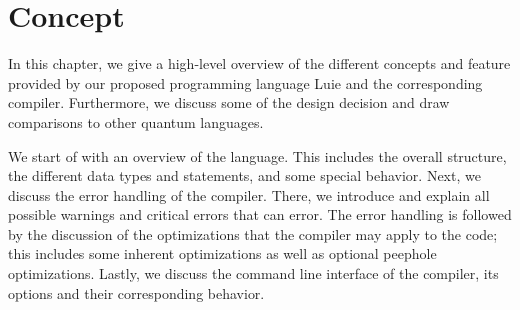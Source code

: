 \chapter{Concept}
In this chapter, we give a high-level overview of the different concepts and feature provided by our proposed programming language Luie and the corresponding compiler. Furthermore, we discuss some of the design decision and draw comparisons to other quantum languages. 

We start of with an overview of the language. This includes the overall structure, the different data types and statements, and some special behavior. Next, we discuss the error handling of the compiler. There, we introduce and explain all possible warnings and critical errors that can error. The error handling is followed by the discussion of the optimizations that the compiler may apply to the code; this includes some inherent optimizations as well as optional peephole optimizations. Lastly, we discuss the command line interface of the compiler, its options and their corresponding behavior.   







